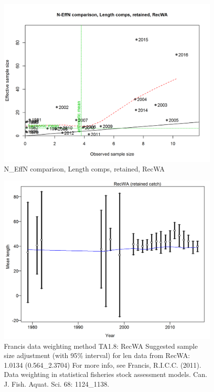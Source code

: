 \documentclass[12pt,]{article}
\begin{document}
\begin{figure}[htbp]
\centering
\includegraphics{./r4ss/plots_mod1/comp_lenfit_sampsize_flt4mkt2.png}
\caption{N\_EffN comparison, Length comps, retained, RecWA
\label{fig:mod1_20_comp_lenfit_sampsize_flt4mkt2}}
\end{figure}

\begin{figure}[htbp]
\centering
\includegraphics{./r4ss/plots_mod1/comp_lenfit_data_weighting_TA1.8_RecWA.png}
\caption{Francis data weighting method TA1.8: RecWA Suggested sample
size adjustment (with 95\% interval) for len data from RecWA: 1.0134
(0.564\_2.3704) For more info, see Francis, R.I.C.C. (2011). Data
weighting in statistical fisheries stock assessment models. Can. J.
Fish. Aquat. Sci. 68: 1124\_1138.
\label{fig:mod1_21_comp_lenfit_data_weighting_TA1.8_RecWA}}
\end{figure}
\end{document}

